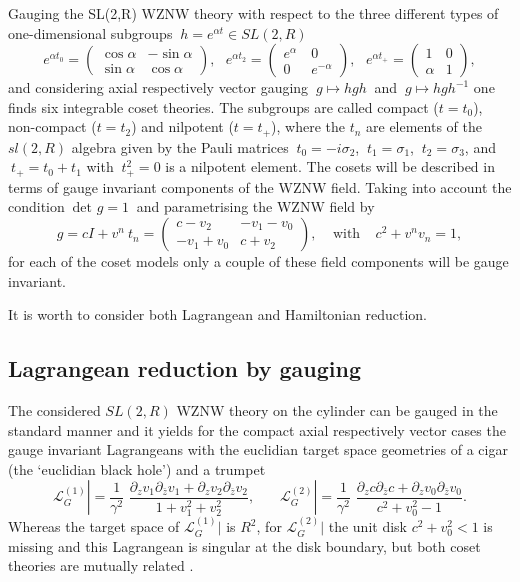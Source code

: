 \documentclass[a4paper,12]{article}
\begin{document}
Gauging the SL(2,R) WZNW theory with respect to the three different
types of one-dimensional subgroups $~h=e^{\alpha t}\in SL(2,R)$
\begin{equation}\label{H}
 e^{\alpha t_0}=\left( \begin{array}{cr}
  \cos\alpha&-\sin\alpha\\\sin\alpha&\cos\alpha \end{array}\right),
~~~e^{\alpha t_2}  =\left( \begin{array}{cr}
  e^\alpha&~0~~\\0&~e^{-\alpha} \end{array}\right),~~~
e^{\alpha t_+} =\left( \begin{array}{cr}
  1&0\\\alpha&1 \end{array}\right),
\end{equation}
and considering axial respectively vector gauging $~g\mapsto hgh~$ and $~
g\mapsto hgh^{-1}$ one finds six integrable \cite{MW} coset theories.
The subgroups are called compact ($t=t_0$), non-compact ($t=t_2$) and nilpotent
($t=t_+$), where the $t_n$ are  elements of the $sl(2,R)$ algebra given
by the Pauli matrices $~t_0=-i\sigma_2$, $~t_1=\sigma_1$,
$~t_2=\sigma_3$, and $~t_+=t_0+t_1$ with $~t_+^2=0$ is a nilpotent element.
The cosets will be described in terms of gauge invariant components
of the WZNW field. Taking into account the condition $~\mbox{det}\,\,g=1~$ and 
parametrising the WZNW field by 
\begin{equation}\label{g=c,v_n}
  g=cI+v^n~t_n= \left( \begin{array}{cr}
  c-v_2&-v_1-v_0\\-v_1+v_0&c+v_2 \end{array}\right),~~~~~\mbox{with}~~~~~
c^2+v^nv_n=1,
\end{equation}
for each of the coset models only a couple of these field components
will be gauge invariant.

It is worth to consider both Lagrangean and Hamiltonian reduction.


\subsection{Lagrangean reduction by gauging}

The considered $SL(2,R)$ WZNW theory on the cylinder can be gauged in
the standard manner and it yields for the compact axial respectively
vector cases the gauge invariant  Lagrangeans with the euclidian target
space geometries of a cigar (the `euclidian black hole') and a trumpet 
\begin{equation}\label{Compact}
{\mathcal L}_G^{(1)} |=\frac{1}{\gamma^2}\,\,
 \frac{\partial_zv_1 \partial_{\bar z}v_1 +
\partial_zv_2\partial_{\bar z}v_2}{1+v_1^2 + v_2^2},~~~~~~~~
{\mathcal L}_G^{(2)} |=\frac{1}{\gamma^2}\,\,
 \frac{\partial_zc \partial_{\bar z}c +
\partial_zv_0\partial_{\bar z}v_0}{c^2 + v_0^2-1}.
\end{equation}
Whereas the target space of ${\mathcal L}_G^{(1)} |$ is $R^2$,
for ${\mathcal L}_G^{(2)} |$  the unit
disk $c^2+v_0^2<1$ is missing and this Lagrangean 
is singular at the disk boundary, but both coset theories are 
mutually related \cite{FJW2}.
\end{document}
